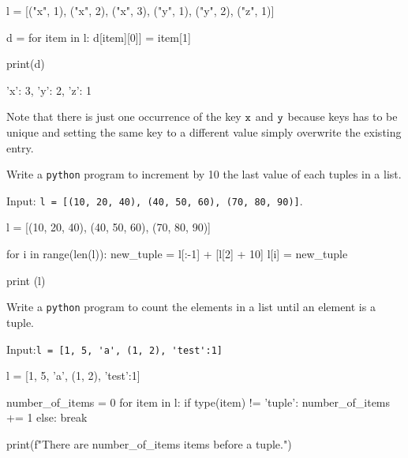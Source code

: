 \cprotEnv\begin{solution}
\begin{ipython}
l = [("x", 1), ("x", 2), ("x", 3), ("y", 1), ("y", 2), ("z", 1)]

d = {}
for item in l:
    d[item][0]] = item[1]
    
print(d)
\end{ipython}
\begin{ioutput}
{'x': 3, 'y': 2, 'z': 1}
\end{ioutput}
Note that there is just one occurrence of the key $\tt{x}$ and $\tt{y}$ because keys has to be unique and setting the same key to a different value simply overwrite the existing entry.
\end{solution}

\begin{question}
Write a \texttt{python} program to increment by 10 the last value of each tuples in a list.

\noindent
Input: \lstinline[language=iPython]|l = [(10, 20, 40), (40, 50, 60), (70, 80, 90)]|.
\end{question}

\cprotEnv\begin{solution}
\begin{ipython}
l = [(10, 20, 40), (40, 50, 60), (70, 80, 90)]

for i in range(len(l)):
    new_tuple = l[:-1] + [l[2] + 10]
    l[i] = new_tuple
    
print (l)
\end{ipython}
\begin{ioutput}
[(10, 20, 50), (40, 50, 70), (70, 80, 100)]
\end{ioutput}
\end{solution}

\begin{question}
Write a \texttt{python} program to count the elements in a list until an element is a tuple.

\noindent
Input:\lstinline[language=iPython]|l = [1, 5, 'a', (1, 2), 'test':1]|
\end{question}

\cprotEnv\begin{solution}
\begin{ipython}
l = [1, 5, 'a', (1, 2), 'test':1]

number_of_items = 0 
for item in l:
    if type(item) != 'tuple'{:}
        number_of_items += 1
    else:
        break
        
print(f"There are {number_of_items} items before a tuple.")
\end{ipython}
\begin{ioutput}
\end{ioutput}
\end{solution}

